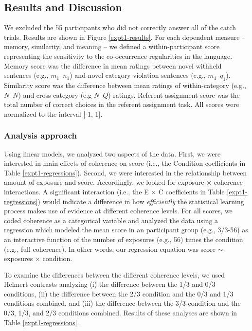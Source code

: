 \documentclass[man,floatsintext]{apa6}
\begin{document}
\subsection{Results and Discussion}
We excluded the 55 participants who did not correctly answer all of the catch trials. Results are shown in Figure \ref{expt1-results}. For each dependent measure -- memory, similarity, and meaning -- we defined a within-participant score representing the sensitivity to the co-occurrence regularities in the language. Memory score was the difference in mean ratings between novel withheld sentences (e.g., $m_1$--$n_1$) and novel category violation sentences (e.g., $m_1$--$q_1$). Similarity score was the difference between mean ratings of within-category (e.g., $N$--$N$) and cross-category (e.g $N$--$Q$) ratings. Referent assignment score was the total number of correct choices in the referent assignment task. All scores were normalized to the interval [-1, 1].

\subsubsection{Analysis approach}
Using linear models, we analyzed two aspects of the data. First, we were interested in main effects of coherence on score (i.e., the Condition coefficients in Table \ref{expt1-regressions}). Second, we were interested in the relationship between amount of exposure and score. Accordingly, we looked for exposure $\times$ coherence interactions. A significant interaction (i.e., the E $\times$ C coefficients in Table \ref{expt1-regressions}) would indicate a difference in how \emph{efficiently} the statistical learning process makes use of evidence at different coherence levels. For all scores, we coded coherence as a categorical variable and analyzed the data using a regression which modeled the mean score in an participant group (e.g., 3/3-56) as an interactive function of the number of exposures (e.g., 56) times the condition (e.g., full coherence). In other words, our regression equation was score $\sim$ exposures $\times$ condition.

To examine the differences between the different coherence levels, we used Helmert contrasts analyzing (i) the difference between the 1/3 and 0/3 conditions, (ii) the difference between the 2/3 condition and the 0/3 and 1/3 conditions combined, and (iii) the difference between the 3/3 condition and the 0/3, 1/3, and 2/3 conditions combined. Results of these analyses are shown in Table \ref{expt1-regressions}.
\end{document}
